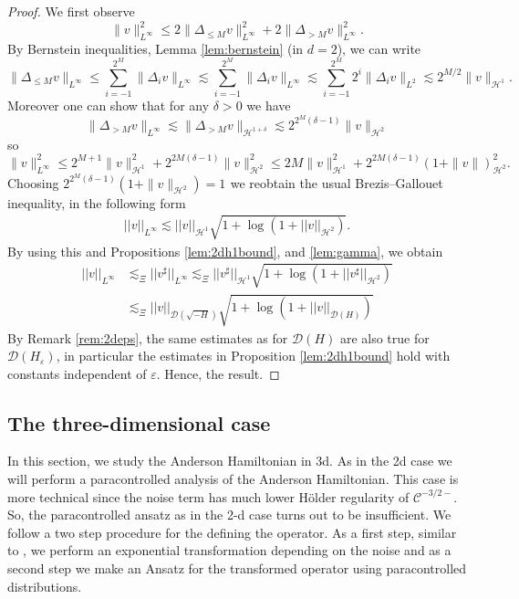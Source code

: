 \documentclass[11pt, oneside]{article}   	%
\newcommand{\CC}{\mathscr{C}}
\newcommand{\ED}{\mathscr{D} ( \sqrt{-H})}
\newcommand{\ssp}{\mathscr{H}}
\begin{document}
\begin{proof}
	
	
		We first observe
		\[ \| v \|_{L^{\infty}}^2 \le 2 \| \Delta_{\le M} v
		\|_{L^{\infty}}^2 + 2 \| \Delta_{> M} v \|_{L^{\infty}}^2. \]
		By Bernstein inequalities, Lemma \ref{lem:bernstein} (in $d = 2$), we can write
		\[ \| \Delta_{\le M} v \|_{L^{\infty}} \le \sum_{i = - 1}^{2^M} \|
		\Delta_i v \|_{L^{\infty}} \lesssim \sum_{i = - 1}^{2^M} \| \Delta_i v
		\|_{L^{\infty}} \lesssim \sum_{i = - 1}^{2^M} 2^i \| \Delta_i v
		\|_{L^2} \lesssim 2^{M/2} \| v \|_{\ssp^1}. \]
		Moreover one can show that for any $\delta > 0$ we have
		\[ \| \Delta_{> M} v \|_{L^{\infty}}  \lesssim \| \Delta_{> M} v \|_{\ssp^{1 +
				\delta}} \lesssim 2^{2^M (\delta - 1)} \| v \|_{\ssp^2} \]
		so
		\[ \| v \|_{L^{\infty}}^2 \le  2^{M+1} \| v \|^2_{\ssp^1} + 2^{2 M
			(\delta - 1)} \| v \|^2_{\ssp^2} \leq 2 M \| v \|^2_{\ssp^1} + 2^{2 M
			(\delta - 1)} (1+\| v \|)^2_{\ssp^2}. \]
		Choosing $2^{2^M (\delta - 1)} (1+ \| v \|_{\ssp^2}) = 1^{}$ we reobtain the usual
		Brezis--Gallouet inequality, in the following form
			\begin{align*}
		||v||_{L^\infty}\lesssim ||v||_{\ssp^1} \sqrt{1+\log(1+||v||_{\ssp^2})}.
		\end{align*}
		By using this and  Propositions \ref{lem:2dh1bound}, and \ref{lem:gamma}, we obtain 
		\begin{align*}
		||v||_{L^\infty}&\lesssim_\Xi||v^\sharp||_{L^\infty}
		\lesssim_\Xi ||v^\sharp||_{\ssp^1}\sqrt{1+\log(1+||v^\sharp||_{\ssp^2})} \\
		&\lesssim_\Xi||v||_{\ED}\sqrt{1+\log(1+||v||_{\mathscr{D}(H)})}
		\end{align*}
		By Remark \ref{rem:2deps}, the same estimates as for $\mathscr{D}(H)$ are also true for $\mathscr{D}(H_\varepsilon)$, in particular the estimates in Proposition \ref{lem:2dh1bound} hold with constants independent of $\varepsilon$. 
	Hence, the result.
\end{proof}


			
\subsection{The three-dimensional case}\label{section:3dham}

In this section, we study the Anderson Hamiltonian in 3d. As in the 2d
case we will perform a paracontrolled analysis of the Anderson Hamiltonian.
This case is more technical since the noise term  has  much lower H\"older
regularity of $\CC^{- 3 / 2 -}$. So, the paracontrolled ansatz as in the 2-d case turns out to be insufficient.  We follow a two step procedure for the defining the operator. As a first step, similar to
{\cite{debussche2016schr}}, we perform an exponential transformation depending
on the noise and as a second step we make an Ansatz for the transformed
operator using paracontrolled distributions.
\end{document}
